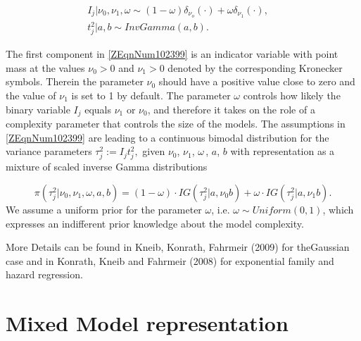 \documentclass[11pt,a4paper,twoside]{bayesxarticle}
\begin{document}
\begin{equation} 
\label{ZEqnNum102399} 
\begin{array}{l} {I_{j} |\nu _{0} ,\nu _{1} ,\omega \sim \left(1-\omega \right)
\delta _{\nu _{o} } \left(\cdot \right)+\omega \delta _{\nu _{1} } \left(\cdot \right),
\quad } \\ {t_{j}^{2} |a,b \sim InvGamma\left(a,b\right).} \end{array} 
\end{equation} 

The first component in \eqref{ZEqnNum102399} is an indicator variable with point 
mass at the values $\nu _{0} >0$ and $\nu _{1} >0$ denoted by the corresponding Kronecker 
symbols. Therein the parameter $\nu _{0} $ should have a positive value close to 
zero and the value of $\nu _{1} $ is set to 1 by default. The parameter $\omega $ controls how 
likely the binary variable $I_{j} $ equals $\nu _{1} $ or $\nu _{0} $, and therefore 
it takes on the role of a complexity parameter that controls the size of the models. 
The assumptions in \eqref{ZEqnNum102399} are leading to a continuous bimodal distribution 
for the variance parameters $\tau _{j}^{2} :=I_{j} t_{j}^{2} ,$ given $\nu _{0} $, $\nu 
_{1} $, $\omega \, $, $a $, $b $ with representation as a mixture 
of scaled inverse Gamma distributions

\[\pi \left(\tau _{j}^{2} |\nu _{0} ,\nu _{1} ,\omega ,a ,b \right)=
\left(1-\omega \right)\cdot IG\left(\tau _{j}^{2} |a ,\nu _{0} b 
\right)+\omega \cdot IG\left(\tau _{j}^{2} |a ,\nu _{1} b \right). \] 
We 
assume a uniform prior for the parameter $\omega $, i.e. $\omega \sim Uniform\left(0,1
\right)$, which expresses an indifferent prior knowledge about the model complexity.

More Details can be found in Kneib, Konrath, Fahrmeir (2009) for theGaussian case 
and in Konrath, Kneib and Fahrmeir (2008) for exponential family and hazard regression.



\section{Mixed Model representation}
\label{glmmrep}
\end{document}
